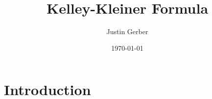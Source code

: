 \documentclass[12pt]{article}
\begin{document}
\title{Kelley-Kleiner Formula}
\author{Justin Gerber}
\date{\today}
\maketitle


\section*{Introduction}






\end{document}

